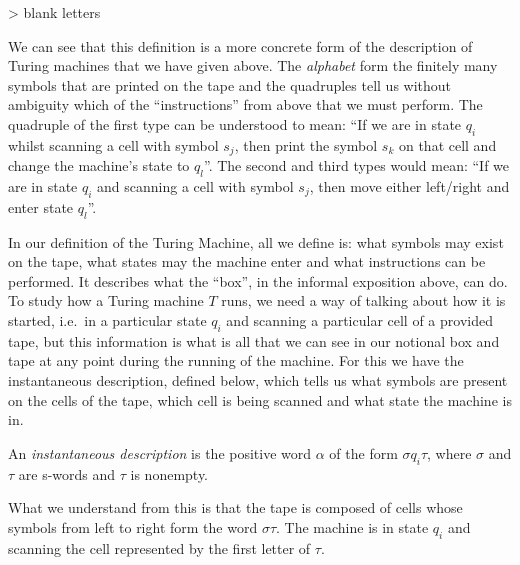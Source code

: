 > blank letters

We can see that this definition is a more concrete form of the description of Turing machines that we have given above. The \emph{alphabet} form the finitely many symbols that are printed on the tape and the quadruples tell us without ambiguity which of the ``instructions'' from above that we must perform. The quadruple of the first type can be understood to mean: ``If we are in state $q_i$ whilst scanning a cell with symbol $s_j$, then print the symbol $s_k$ on that cell and change the machine's state to $q_l$''. The second and third types would mean: ``If we are in state $q_i$ and scanning a cell with symbol $s_j$, then move either left/right and enter state $q_l$''.

In our definition of the Turing Machine, all we define is: what symbols may exist on the tape, what states may the machine enter and what instructions can be performed. It describes what the ``box'', in the informal exposition above, can do. To study how a Turing machine $T$ runs, we need a way of talking about how it is started, i.e.\ in a particular state $q_i$ and scanning a particular cell of a provided tape, but this information is what is all that we can see in our notional box and tape at any point during the running of the machine. For this we have the instantaneous description, defined below, which tells us what symbols are present on the cells of the tape, which cell is being scanned and what state the machine is in.

\begin{definition}
  An \emph{instantaneous description} is the positive word $\alpha$ of the form $\sigma q_i \tau$, where $\sigma$ and $\tau$ are s-words and $\tau$ is nonempty.
\end{definition}

What we understand from this is that the tape is composed of cells whose symbols from left to right form the word $\sigma\tau$. The machine is in state $q_i$ and scanning the cell represented by the first letter of $\tau$.

